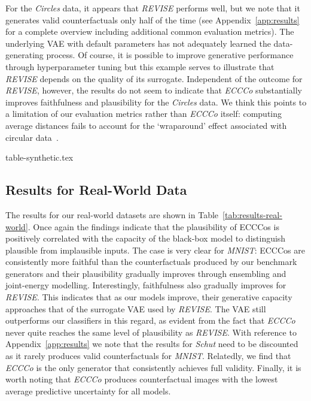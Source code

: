 \documentclass{article}
\begin{document}
For the \textit{Circles} data, it appears that \textit{REVISE} performs well, but we note that it generates valid counterfactuals only half of the time (see Appendix~\ref{app:results} for a complete overview including additional common evaluation metrics). The underlying VAE with default parameters has not adequately learned the data-generating process. Of course, it is possible to improve generative performance through hyperparameter tuning but this example serves to illustrate that \textit{REVISE} depends on the quality of its surrogate. Independent of the outcome for \textit{REVISE}, however, the results do not seem to indicate that \textit{ECCCo} substantially improves faithfulness and plausibility for the \textit{Circles} data. We think this points to a limitation of our evaluation metrics rather than \textit{ECCCo} itself: computing average distances fails to account for the `wraparound' effect associated with circular data~\citep{gill2010circular}.

{table-synthetic.tex}

\subsection{Results for Real-World Data}

The results for our real-world datasets are shown in Table~\ref{tab:results-real-world}. Once again the findings indicate that the plausibility of ECCCos is positively correlated with the capacity of the black-box model to distinguish plausible from implausible inputs. The case is very clear for \textit{MNIST}: ECCCos are consistently more faithful than the counterfactuals produced by our benchmark generators and their plausibility gradually improves through ensembling and joint-energy modelling. Interestingly, faithfulness also gradually improves for \textit{REVISE}. This indicates that as our models improve, their generative capacity approaches that of the surrogate VAE used by \textit{REVISE}. The VAE still outperforms our classifiers in this regard, as evident from the fact that \textit{ECCCo} never quite reaches the same level of plausibility as \textit{REVISE}. With reference to Appendix~\ref{app:results} we note that the results for \textit{Schut} need to be discounted as it rarely produces valid counterfactuals for \textit{MNIST}. Relatedly, we find that \textit{ECCCo} is the only generator that consistently achieves full validity. Finally, it is worth noting that \textit{ECCCo} produces counterfactual images with the lowest average predictive uncertainty for all models. 
\end{document}
